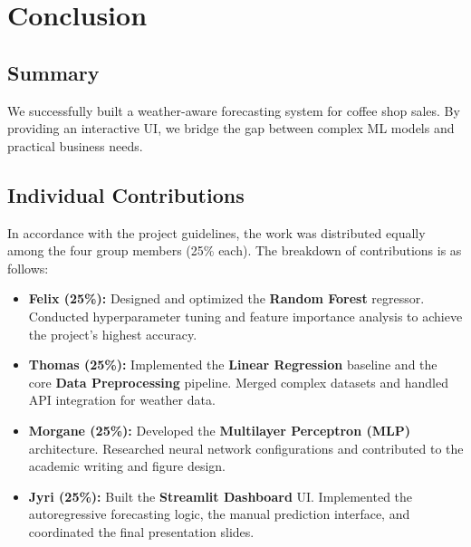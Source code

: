 \chapter{Conclusion}
\label{sec:conclusion}

\section{Summary}
We successfully built a weather-aware forecasting system for coffee shop sales. By providing an interactive UI, we bridge the gap between complex ML models and practical business needs.

\section{Individual Contributions}
In accordance with the project guidelines, the work was distributed equally among the four group members (25\% each). The breakdown of contributions is as follows:

\begin{itemize}
    \item \textbf{Felix (25\%):} Designed and optimized the \textbf{Random Forest} regressor. Conducted hyperparameter tuning and feature importance analysis to achieve the project's highest accuracy.
    \item \textbf{Thomas (25\%):} Implemented the \textbf{Linear Regression} baseline and the core \textbf{Data Preprocessing} pipeline. Merged complex datasets and handled API integration for weather data.
    \item \textbf{Morgane (25\%):} Developed the \textbf{Multilayer Perceptron (MLP)} architecture. Researched neural network configurations and contributed to the academic writing and figure design.
    \item \textbf{Jyri (25\%):} Built the \textbf{Streamlit Dashboard} UI. Implemented the autoregressive forecasting logic, the manual prediction interface, and coordinated the final presentation slides.
\end{itemize}